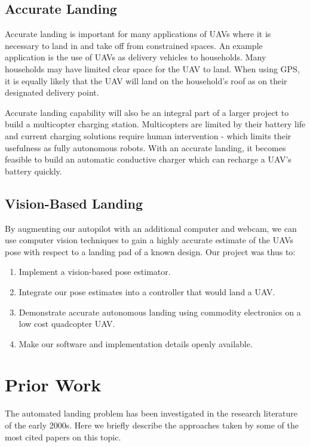 \documentclass[10pt]{scrartcl} %
\begin{document}
\subsection{Accurate Landing}

Accurate landing is important for many applications of UAVs where it is
necessary to land in and take off from constrained spaces. An example
application is the use of UAVs as delivery vehicles to households. Many
households may have limited clear space for the UAV to land. When using GPS, it
is equally likely that the UAV will land on the household's roof as on their
designated delivery point.

Accurate landing capability will also be an integral part of a larger project
to build a multicopter charging station. Multicopters are limited by their
battery life and current charging solutions require human intervention - which
limits their usefulness as fully autonomous robots.  With an accurate landing,
it becomes feasible to build an automatic conductive charger which can recharge
a UAV's battery quickly.

\subsection{Vision-Based Landing}

By augmenting our autopilot with an additional computer and webcam, we can use
computer vision techniques to gain a highly accurate estimate of the UAVs pose
with respect to a landing pad of a known design.
Our project was thus to:

\begin{enumerate}
\item{Implement a vision-based pose estimator.}
\item{Integrate our pose estimates into a controller that would land a UAV.}
\item{Demonstrate accurate autonomous landing using commodity electronics on a
low cost quadcopter UAV.}
\item{Make our software and implementation details openly available.}
\end{enumerate}

\section{Prior Work}

The automated landing problem has been investigated in the research literature
of the early 2000s. Here we briefly describe the approaches taken by some of
the most cited papers on this topic.
\end{document}
